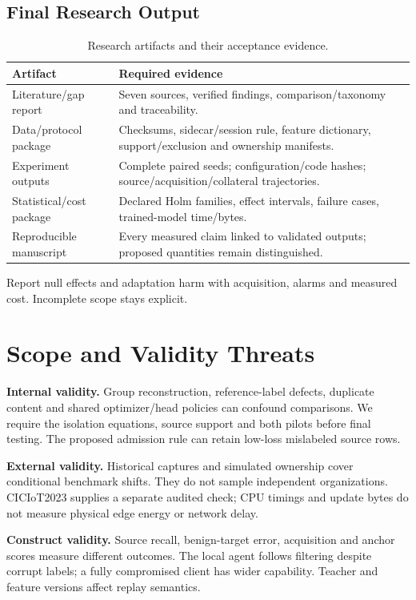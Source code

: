 \documentclass[10pt,a4paper]{article}
\begin{document}
\subsection{Final Research Output}
\begin{table}[htbp]
\centering\footnotesize
\caption{Research artifacts and their acceptance evidence.}
\label{tab:artifacts}
\begin{tabularx}{\linewidth}{L{3.2cm}Y}
\toprule
Artifact & Required evidence\\
\midrule
Literature/gap report & Seven sources, verified findings, comparison/taxonomy and traceability.\\
Data/protocol package & Checksums, sidecar/session rule, feature dictionary, support/exclusion and ownership manifests.\\
Experiment outputs & Complete paired seeds; configuration/code hashes; source/acquisition/collateral trajectories.\\
Statistical/cost package & Declared Holm families, effect intervals, failure cases, trained-model time/bytes.\\
Reproducible manuscript & Every measured claim linked to validated outputs; proposed quantities remain distinguished.\\
\bottomrule
\end{tabularx}
\end{table}
Report null effects and adaptation harm with acquisition, alarms and measured cost. Incomplete scope stays explicit.

\section{Scope and Validity Threats}
\textbf{Internal validity.} Group reconstruction, reference-label defects, duplicate content and shared optimizer/head policies can confound comparisons. We require the isolation equations, source support and both pilots before final testing. The proposed admission rule can retain low-loss mislabeled source rows.

\textbf{External validity.} Historical captures and simulated ownership cover conditional benchmark shifts. They do not sample independent organizations. CICIoT2023 supplies a separate audited check; CPU timings and update bytes do not measure physical edge energy or network delay.

\textbf{Construct validity.} Source recall, benign-target error, acquisition and anchor scores measure different outcomes. The local agent follows filtering despite corrupt labels; a fully compromised client has wider capability. Teacher and feature versions affect replay semantics.
\end{document}
